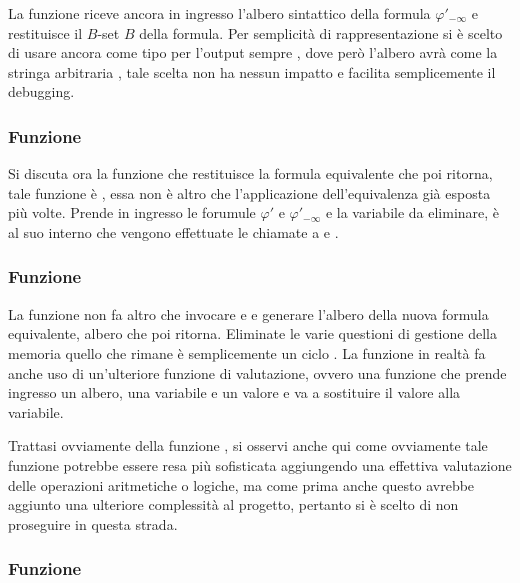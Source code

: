 \documentclass[11pt,letterpaper,twoside]{article}
\begin{document}
La funzione 
riceve ancora in ingresso l'albero sintattico della formula $\varphi'_{- \infty}$
e restituisce il $B$-set $B$ della formula. Per semplicità di rappresentazione
si è scelto di usare ancora come tipo per l'output sempre
, dove però l'albero avrà come  la
stringa arbitraria , tale scelta non ha nessun impatto e
facilita semplicemente il debugging.

\subsubsection{Funzione }

Si discuta ora la funzione che restituisce la formula equivalente che poi
 ritorna, tale funzione è , essa non è
altro che l'applicazione dell'equivalenza già esposta più volte. Prende in
ingresso le forumule $\varphi'$ e $\varphi'_{-\infty}$ e la variabile da
eliminare, è al suo interno che vengono effettuate le chiamate a
 e .

\subsubsection{Funzione }

La funzione  non fa altro che invocare  e
 e generare l'albero della nuova formula equivalente,
albero che poi ritorna. Eliminate le varie questioni di gestione della memoria
quello che rimane è semplicemente un ciclo . La funzione in realtà
fa anche uso di un'ulteriore funzione di valutazione, ovvero una funzione che
prende ingresso un albero, una variabile e un valore e va a sostituire il valore
alla variabile.

Trattasi ovviamente della funzione , si osservi anche qui come ovviamente tale funzione
potrebbe essere resa più sofisticata aggiungendo una effettiva valutazione delle
operazioni aritmetiche o logiche, ma come prima anche questo avrebbe aggiunto
una ulteriore complessità al progetto, pertanto si è scelto di non proseguire in
questa strada.

\subsubsection{Funzione }
\end{document}
